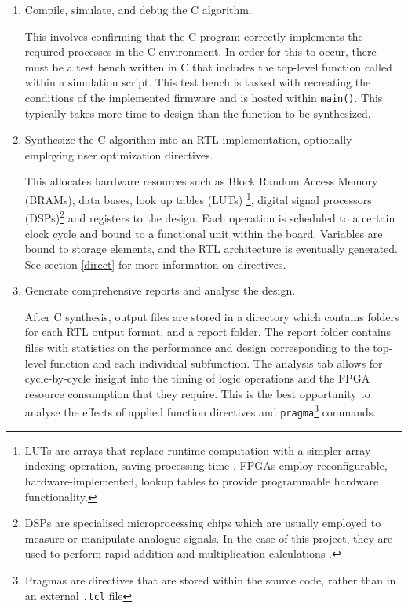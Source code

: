 \documentclass[10pt]{article}
\begin{document}
\begin{enumerate}
	\item Compile, simulate, and debug the C algorithm.
	
	This involves confirming that the C program correctly implements the required processes in the C environment. In order for this to occur, there must be a test bench written in C that includes the top-level function called within a simulation script. This test bench is tasked with recreating the conditions of the implemented firmware and is hosted within \texttt{main()}. This typically takes more time to design than the function to be synthesized.
	
	\item Synthesize the C algorithm into an RTL implementation, optionally employing user optimization directives.
	
	This allocates hardware resources such as Block Random Access Memory (BRAMs), data buses, look up tables (LUTs) \footnote{LUTs are arrays that replace runtime computation with a simpler array indexing operation, saving processing time \cite{hall1997improving}. FPGAs employ reconfigurable, hardware-implemented, lookup tables to provide programmable hardware functionality.}, digital signal processors (DSPs)\footnote{DSPs are specialised microprocessing chips which are usually employed to measure or manipulate analogue signals. In the case of this project, they are used to perform rapid addition and multiplication calculations \cite{liptak2006process}.} and registers to the design. Each operation is scheduled to a certain clock cycle and bound to a functional unit within the board. Variables are bound to storage elements, and the RTL architecture is eventually generated\cite{vahid2010digital}. See section \ref{direct} for more information on directives.
	
	\item Generate comprehensive reports and analyse the design.
	
	After C synthesis, output files are stored in a directory which contains folders for each RTL output format, and a report folder. The report folder contains files with statistics on the performance and design corresponding to the top-level function and each individual subfunction. The analysis tab allows for cycle-by-cycle insight into the timing of logic operations and the FPGA resource consumption that they require. This is the best opportunity to analyse the effects of applied function directives and \texttt{pragma}\footnote{Pragmas are directives that are stored within the source code, rather than in an external \texttt{.tcl} file} commands.
	

\end{enumerate}
\end{document}
